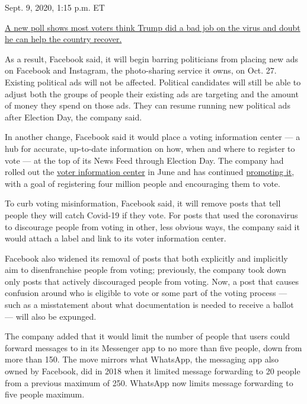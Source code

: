 Sept. 9, 2020, 1:15 p.m. ET

\href{https://www.nytimes3xbfgragh.onion/live/2020/09/09/us/trump-vs-biden\#a-new-poll-shows-most-voters-think-trump-did-a-bad-job-on-the-virus-and-doubt-he-can-help-the-country-recover}{A
new poll shows most voters think Trump did a bad job on the virus and
doubt he can help the country recover.}

As a result, Facebook said, it will begin barring politicians from
placing new ads on Facebook and Instagram, the photo-sharing service it
owns, on Oct. 27. Existing political ads will not be affected. Political
candidates will still be able to adjust both the groups of people their
existing ads are targeting and the amount of money they spend on those
ads. They can resume running new political ads after Election Day, the
company said.

In another change, Facebook said it would place a voting information
center --- a hub for accurate, up-to-date information on how, when and
where to register to vote --- at the top of its News Feed through
Election Day. The company had rolled out the
\href{https://www.nytimes3xbfgragh.onion/2020/08/13/us/politics/facebook-election-hub-vote-by-mail.html}{voter
information center} in June and has continued
\href{https://www.nytimes3xbfgragh.onion/2020/06/16/technology/opt-out-political-ads-facebook.html}{promoting
it}, with a goal of registering four million people and encouraging them
to vote.

To curb voting misinformation, Facebook said, it will remove posts that
tell people they will catch Covid-19 if they vote. For posts that used
the coronavirus to discourage people from voting in other, less obvious
ways, the company said it would attach a label and link to its voter
information center.

Facebook also widened its removal of posts that both explicitly and
implicitly aim to disenfranchise people from voting; previously, the
company took down only posts that actively discouraged people from
voting. Now, a post that causes confusion around who is eligible to vote
or some part of the voting process --- such as a misstatement about what
documentation is needed to receive a ballot --- will also be expunged.

The company added that it would limit the number of people that users
could forward messages to in its Messenger app to no more than five
people, down from more than 150. The move mirrors what WhatsApp, the
messaging app also owned by Facebook, did in 2018 when it limited
message forwarding to 20 people from a previous maximum of 250. WhatsApp
now limits message forwarding to five people maximum.

